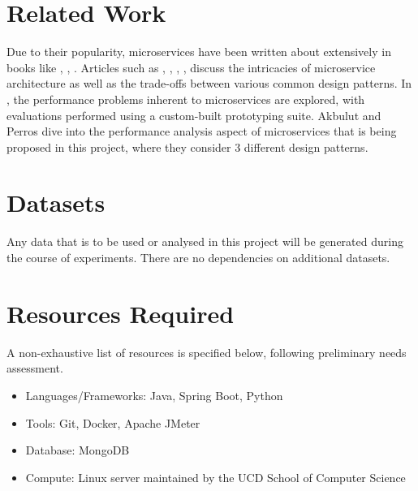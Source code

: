 \section{Related Work}
Due to their popularity, microservices have been written about extensively in books like \cite{richardson18}, \cite{kleppmann17}, \cite{newman14}. Articles such as \cite{md19}, \cite{md20}, \cite{sahiti20}, \cite{udantha19}, \cite{lewis14} discuss the intricacies of microservice architecture as well as the trade-offs between various common design patterns. In \cite{cully20}, the performance problems inherent to microservices are explored, with evaluations performed using a custom-built prototyping suite. Akbulut and Perros \cite{akbulut19} dive into the performance analysis aspect of microservices that is being proposed in this project, where they consider 3 different design patterns.

\section{Datasets}
Any data that is to be used or analysed in this project will be generated during the course of experiments. There are no dependencies on additional datasets.

\section{Resources Required}
A non-exhaustive list of resources is specified below, following preliminary needs assessment.

\begin{itemize}
	\item Languages/Frameworks: Java, Spring Boot, Python
	\item Tools: Git, Docker, Apache JMeter
	\item Database: MongoDB
	\item Compute: Linux server maintained by the UCD School of Computer Science
\end{itemize}


